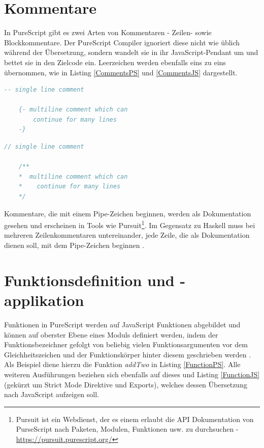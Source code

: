 \documentclass[
12pt,
ngerman,
oneside]
{scrbook} %
\begin{document}
\chapter{Kommentare}
In PureScript gibt es zwei Arten von Kommentaren - Zeilen- sowie Blockkommentare. Der PureScript Compiler ignoriert diese nicht wie üblich während der Übersetzung, sondern wandelt sie in ihr JavaScript-Pendant um und bettet sie in den Zielcode ein. Leerzeichen werden ebenfalls eins zu eins übernommen, wie in Listing \ref{CommentsPS} und \ref{CommentsJS} dargestellt.
\noindent\begin{minipage}[t]{.49\textwidth} 
	\hspace*{0pt}\begin{lstlisting}[language=purescript, style=only-rect, caption= Kommentare PS, label=CommentsPS]
	-- single line comment
	
	{- multiline comment which can
		continue for many lines
	-}
	\end{lstlisting}
\end{minipage}%
% 
\hfill%
\begin{minipage}[t]{.49\textwidth} 
	\hspace*{0pt}\begin{lstlisting}[language=javascript, style=only-rect, caption= Kommentare JS, label=CommentsJS] 
	// single line comment
	
	/**
	*  multiline comment which can
	*    continue for many lines
	*/
	\end{lstlisting}
\end{minipage}
\hfill%
Kommentare, die mit einem Pipe-Zeichen beginnen, werden als Dokumentation gesehen und erscheinen in Tools wie Pursuit\footnote{Pursuit ist ein Webdienst, der es einem erlaubt die API Dokumentation von PurseScript nach Paketen, Modulen, Funktionen usw.  zu durchsuchen - \href{https://pursuit.purescript.org/}{https://pursuit.purescript.org/}}. Im Gegensatz zu Haskell muss bei mehreren Zeilenkommentaren untereinander, jede Zeile, die als Dokumentation dienen soll, mit dem Pipe-Zeichen beginnen \cite{PSSyntax18}.


\chapter{Funktionsdefinition und -applikation}
\label{functionDefAndApp}
Funktionen in PureScript werden auf JavaScript Funktionen abgebildet und können auf oberster Ebene eines Moduls definiert werden, indem der Funktionsbezeichner gefolgt von beliebig vielen Funktionsargumenten vor dem Gleichheitszeichen und der Funktionskörper hinter diesem geschrieben werden \cite[][S. 17]{Freeman17}. Als Beispiel diene hierzu die Funktion \emph{addTwo} in Listing \ref{FunctionPS}. Alle weiteren Ausführungen beziehen sich ebenfalls auf dieses und Listing \ref{FunctionJS} (gekürzt um Strict Mode Direktive und Exports), welches dessen Übersetzung nach JavaScript aufzeigen soll. 
\end{document}
